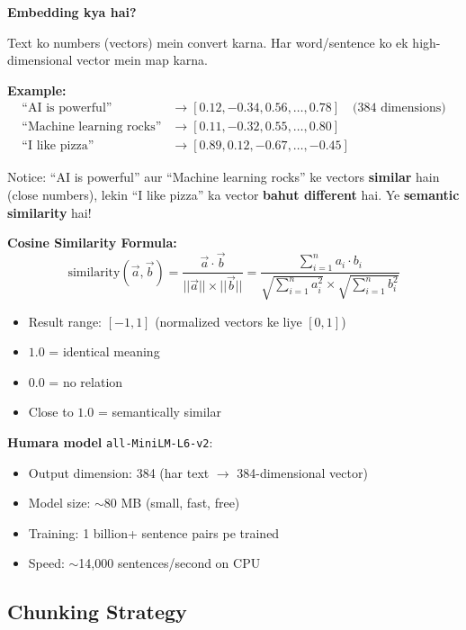 \documentclass[12pt, a4paper]{article}
\begin{document}
\begin{mathbox}
\textbf{Embedding kya hai?}

Text ko numbers (vectors) mein convert karna. Har word/sentence ko ek high-dimensional vector mein map karna.

\textbf{Example:}
\begin{align}
\text{``AI is powerful''} &\rightarrow [0.12, -0.34, 0.56, \ldots, 0.78] \quad \text{(384 dimensions)} \\
\text{``Machine learning rocks''} &\rightarrow [0.11, -0.32, 0.55, \ldots, 0.80]  \\
\text{``I like pizza''} &\rightarrow [0.89, 0.12, -0.67, \ldots, -0.45]
\end{align}

Notice: ``AI is powerful'' aur ``Machine learning rocks'' ke vectors \textbf{similar} hain (close numbers), lekin ``I like pizza'' ka vector \textbf{bahut different} hai. Ye \textbf{semantic similarity} hai!

\textbf{Cosine Similarity Formula:}
\[
\text{similarity}(\vec{a}, \vec{b}) = \frac{\vec{a} \cdot \vec{b}}{||\vec{a}|| \times ||\vec{b}||} = \frac{\sum_{i=1}^{n} a_i \cdot b_i}{\sqrt{\sum_{i=1}^{n} a_i^2} \times \sqrt{\sum_{i=1}^{n} b_i^2}}
\]

\begin{itemize}
\item Result range: $[-1, 1]$ (normalized vectors ke liye $[0, 1]$)
\item $1.0$ = identical meaning
\item $0.0$ = no relation
\item Close to $1.0$ = semantically similar
\end{itemize}

\textbf{Humara model} \texttt{all-MiniLM-L6-v2}:
\begin{itemize}
\item Output dimension: 384 (har text $\rightarrow$ 384-dimensional vector)
\item Model size: $\sim$80 MB (small, fast, free)
\item Training: 1 billion+ sentence pairs pe trained
\item Speed: $\sim$14,000 sentences/second on CPU
\end{itemize}
\end{mathbox}

\subsection{Chunking Strategy}
\end{document}

